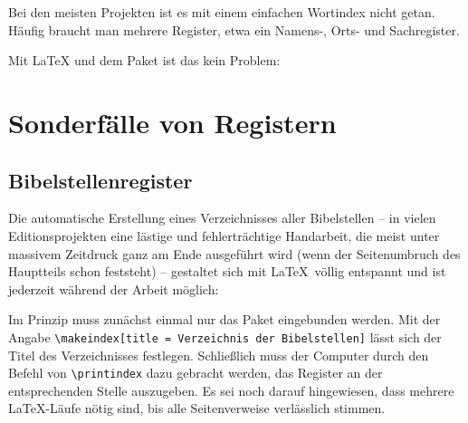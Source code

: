 Bei den meisten Projekten ist es mit einem einfachen Wortindex nicht getan.
Häufig braucht man mehrere Register, etwa ein Namens-, Orts- und Sachregister.

Mit \LaTeX{} und dem Paket  ist das kein Problem:





\section{Sonderfälle von Registern}

\subsection{Bibelstellenregister}
\label{Bibelstellenregister}

Die automatische Erstellung eines Verzeichnisses aller Bibelstellen -- in vielen Editionsprojekten
eine lästige und fehlerträchtige Handarbeit, die meist unter massivem Zeitdruck ganz am Ende ausgeführt
wird (wenn der Seitenumbruch des Hauptteils schon feststeht) -- gestaltet sich mit \LaTeX\ völlig
entspannt und ist jederzeit während der Arbeit möglich:

Im Prinzip muss zunächst einmal nur das Paket  eingebunden werden.
Mit der Angabe \lstinline/\makeindex[title = Verzeichnis der Bibelstellen]/
lässt sich der Titel des Verzeichnisses festlegen.
Schließlich muss der Computer durch den Befehl von \lstinline/\printindex/ dazu gebracht werden,
das Register an der entsprechenden Stelle auszugeben.
Es sei noch darauf hingewiesen, dass mehrere \LaTeX -Läufe nötig sind, bis alle Seitenverweise
verlässlich stimmen.


